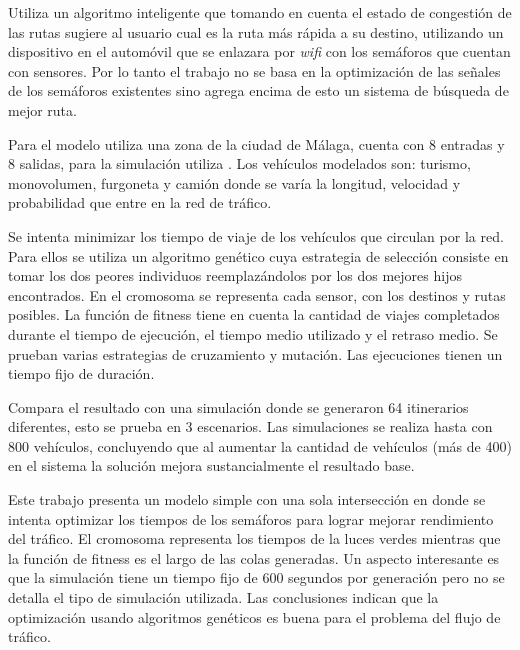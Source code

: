 \begin{itemize}
\begin{item}
		Utiliza un algoritmo inteligente que tomando en cuenta el estado de congestión de las rutas sugiere al usuario cual es la ruta más rápida a su destino, utilizando un dispositivo en el automóvil que se enlazara por \emph{wifi} con los semáforos que cuentan con sensores. Por lo tanto el trabajo no se basa en la optimización de las señales de los semáforos existentes sino agrega encima de esto un sistema de búsqueda de mejor ruta.
		
		Para el modelo utiliza una zona  de la ciudad de Málaga, cuenta con 8 entradas y 8 salidas, para la simulación utiliza \citet{SUMO}. Los vehículos modelados son: turismo, monovolumen, furgoneta y camión donde se varía la longitud, velocidad y probabilidad que entre en la red de tráfico.
		
		Se intenta minimizar los tiempo de viaje de los vehículos que circulan por la red. Para ellos se utiliza un algoritmo genético cuya estrategia de selección consiste en tomar los dos peores individuos reemplazándolos por los dos mejores hijos encontrados. En el cromosoma se representa cada sensor, con los destinos y rutas posibles. La función de fitness tiene en cuenta la cantidad de viajes completados durante el tiempo de ejecución, el tiempo medio utilizado y el retraso medio. Se prueban varias estrategias de cruzamiento y mutación. Las ejecuciones tienen un tiempo fijo de duración.
		
		
		Compara el resultado con una simulación donde se generaron 64 itinerarios diferentes, esto se prueba en 3 escenarios. Las simulaciones se realiza hasta con 800 vehículos, concluyendo que al aumentar la cantidad de vehículos (más de 400) en el sistema la solución mejora sustancialmente el resultado base.
		
	\end{item}	
	
	
	\begin{item}
		Este trabajo presenta un modelo simple con una sola intersección en donde se intenta optimizar los tiempos de los semáforos para lograr mejorar rendimiento del tráfico. El cromosoma representa los tiempos de la luces verdes mientras que la función de fitness es el largo de las colas generadas. Un aspecto interesante es que la simulación tiene un tiempo fijo de 600 segundos por generación pero no se detalla el tipo de simulación utilizada. Las conclusiones indican que la optimización usando algoritmos genéticos  es buena para el problema del flujo de tráfico.	
	\end{item}	
	

\end{itemize}
